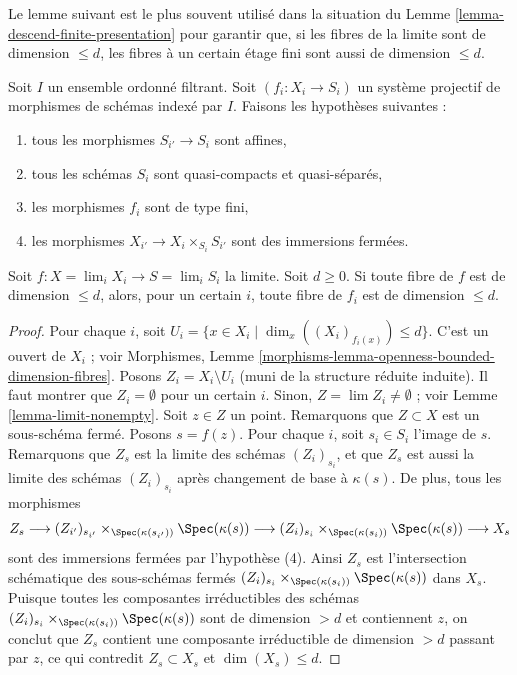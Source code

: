 \noindent
Le lemme suivant est le plus souvent utilisé dans la situation du
Lemme \ref{lemma-descend-finite-presentation}
pour garantir que, si les fibres de la limite sont de dimension $\leq d$,
les fibres à un certain étage fini sont aussi de dimension $\leq d$.

\begin{lemma}
\label{lemma-limit-dimension}
Soit $I$ un ensemble ordonné filtrant.
Soit $(f_i : X_i \to S_i)$ un système projectif de morphismes de schémas
indexé par $I$. Faisons les hypothèses suivantes :
\begin{enumerate}
\item tous les morphismes $S_{i'} \to S_i$ sont affines,
\item tous les schémas $S_i$ sont quasi-compacts et quasi-séparés,
\item les morphismes $f_i$ sont de type fini,
\item les morphismes $X_{i'} \to X_i \times_{S_i} S_{i'}$ sont des immersions
fermées.
\end{enumerate}
Soit $f : X = \lim_i X_i \to S = \lim_i S_i$ la limite.
Soit $d \geq 0$.
Si toute fibre de $f$ est de dimension $\leq d$, alors, pour un certain $i$,
toute fibre de $f_i$ est de dimension $\leq d$.
\end{lemma}

\begin{proof}
Pour chaque $i$, soit $U_i = \{x \in X_i \mid \dim_x((X_i)_{f_i(x)}) \leq d\}$.
C'est un ouvert de $X_i$ ; voir
Morphismes, Lemme \ref{morphisms-lemma-openness-bounded-dimension-fibres}.
Posons $Z_i = X_i \setminus U_i$ (muni de la structure réduite induite).
Il faut montrer que $Z_i = \emptyset$ pour un certain $i$.
Sinon, $Z = \lim Z_i \not = \emptyset$ ; voir
Lemme \ref{lemma-limit-nonempty}.
Soit $z \in Z$ un point. Remarquons que $Z \subset X$ est un sous-schéma fermé.
Posons $s = f(z)$. Pour chaque $i$, soit $s_i \in S_i$ l'image
de $s$. Remarquons que $Z_s$ est la limite des schémas $(Z_i)_{s_i}$,
et que $Z_s$ est aussi la limite des schémas $(Z_i)_{s_i}$ après changement
de base à $\kappa(s)$. De plus, tous les morphismes
$$
Z_s
\longrightarrow
(Z_{i'})_{s_{i'}} \times_{\Spec(\kappa(s_{i'}))} \Spec(\kappa(s))
\longrightarrow
(Z_i)_{s_i} \times_{\Spec(\kappa(s_i))} \Spec(\kappa(s))
\longrightarrow
X_s
$$
sont des immersions fermées par l'hypothèse (4). Ainsi $Z_s$ est l'intersection
schématique des sous-schémas fermés
$(Z_i)_{s_i} \times_{\Spec(\kappa(s_i))} \Spec(\kappa(s))$
dans $X_s$. Puisque toutes les composantes irréductibles des schémas
$(Z_i)_{s_i} \times_{\Spec(\kappa(s_i))} \Spec(\kappa(s))$
sont de dimension $> d$ et contiennent $z$, on conclut que
$Z_s$ contient une composante irréductible de dimension $> d$ passant
par $z$, ce qui contredit $Z_s \subset X_s$ et
$\dim(X_s) \leq d$.
\end{proof}

